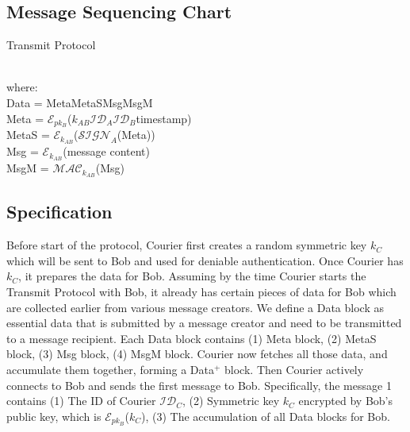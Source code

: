 \subsection{Message Sequencing Chart}
\begin{msc}{Transmit Protocol}
\setlength{\instdist}{3\instdist}
\setlength{\envinstdist}{2\envinstdist}
\setlength{\levelheight}{1.5\levelheight}

\nextlevel[4]
\nextlevel
{}
\nextlevel[2]
\nextlevel
{}
\nextlevel
\end{msc}
\\
where: \\
Data = Meta\textbar\textbar MetaS\textbar\textbar Msg\textbar\textbar MsgM\\
Meta = $\mathcal{E}_{pk_B}$($k_{AB}$\textbar\textbar $ \mathcal{ID}_A $\textbar\textbar $ \mathcal{ID}_B $\textbar\textbar timestamp)\\
MetaS = $\mathcal{E}_{k_{AB}}$($\mathcal{SIGN}_A$(Meta))\\
Msg = $\mathcal{E}_{k_{AB}}$(message content)\\
MsgM = $\mathcal{MAC}_{k_{AB}}$(Msg)

\subsection{Specification}
Before start of the protocol, Courier first creates a random symmetric key $k_C$ which will be sent to Bob and used for deniable authentication. Once Courier has $ k_C $, it prepares the data for Bob. Assuming by the time Courier starts the Transmit Protocol with Bob, it already has certain pieces of data for Bob which are collected earlier from various message creators. We define a Data block as essential data that is submitted by a message creator and need to be transmitted to a message recipient. Each Data block contains (1) Meta block, (2) MetaS block, (3) Msg block, (4) MsgM block. Courier now fetches all those data, and accumulate them together, forming a Data$^+$ block. Then Courier actively connects to Bob and sends the first message to Bob. Specifically, the message 1 contains (1) The ID of Courier $\mathcal{ID}_C$, (2) Symmetric key $k_C$ encrypted by Bob's public key, which is $\mathcal{E}_{pk_B}$($k_C$), (3) The accumulation of all Data blocks for Bob.

